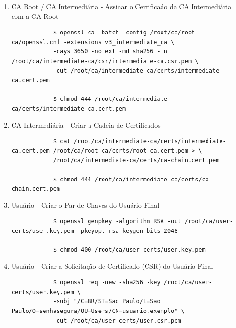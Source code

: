 \documentclass{article}
\begin{document}
\begin{enumerate}
	\item CA Root / CA Intermediária - Assinar o Certificado da CA Intermediária com a CA Root
	\begin{tcolorbox}[width=\textwidth]
	{\footnotesize
		\begin{verbatim}
			$ openssl ca -batch -config /root/ca/root-ca/openssl.cnf -extensions v3_intermediate_ca \
			-days 3650 -notext -md sha256 -in /root/ca/intermediate-ca/csr/intermediate-ca.csr.pem \
			-out /root/ca/intermediate-ca/certs/intermediate-ca.cert.pem

			$ chmod 444 /root/ca/intermediate-ca/certs/intermediate-ca.cert.pem
		\end{verbatim}
	}
	\end{tcolorbox}

	\item CA Intermediária - Criar a Cadeia de Certificados
	\begin{tcolorbox}[width=\textwidth]
	{\footnotesize
		\begin{verbatim}
			$ cat /root/ca/intermediate-ca/certs/intermediate-ca.cert.pem /root/ca/root-ca/certs/root-ca.cert.pem > \
			/root/ca/intermediate-ca/certs/ca-chain.cert.pem

			$ chmod 444 /root/ca/intermediate-ca/certs/ca-chain.cert.pem
		\end{verbatim}
	}
	\end{tcolorbox}

	\item Usuário - Criar o Par de Chaves do Usuário Final
	\begin{tcolorbox}[width=\textwidth]
	{\footnotesize
		\begin{verbatim}
			$ openssl genpkey -algorithm RSA -out /root/ca/user-certs/user.key.pem -pkeyopt rsa_keygen_bits:2048

			$ chmod 400 /root/ca/user-certs/user.key.pem
		\end{verbatim}
	}
	\end{tcolorbox}

	\item Usuário - Criar a Solicitação de Certificado (CSR) do Usuário Final
	\begin{tcolorbox}[width=\textwidth]
	{\footnotesize
		\begin{verbatim}
			$ openssl req -new -sha256 -key /root/ca/user-certs/user.key.pem \
			-subj "/C=BR/ST=Sao Paulo/L=Sao Paulo/O=senhasegura/OU=Users/CN=usuario.exemplo" \
			-out /root/ca/user-certs/user.csr.pem
		\end{verbatim}
	}
	\end{tcolorbox}


\end{enumerate}
\end{document}
